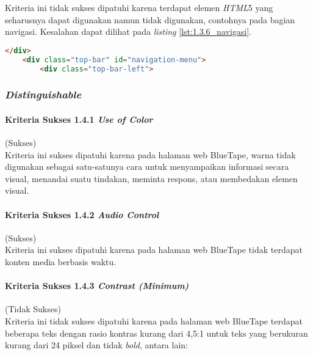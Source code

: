 Kriteria ini tidak sukses dipatuhi karena terdapat elemen \textit{HTML}5 yang seharusnya dapat digunakan namun tidak digunakan, contohnya pada bagian navigasi. Kesalahan dapat dilihat pada \textit{listing} \ref{lst:1.3.6_navigasi}.

\begin{lstlisting}[frame=single, label={lst:1.3.6_navigasi}, language=HTML, caption=Kriteria Sukses 1.3.6 - Navigasi]
    </div>
    <div class="top-bar" id="navigation-menu">
        <div class="top-bar-left">
\end{lstlisting}

\subsubsection{\textit{Distinguishable}}
\label{subsubsec:kepatuhan_bluetape_distinguishable}

\paragraph{Kriteria Sukses 1.4.1 \textit{Use of Color}}
\label{par:kepatuhan_bluetape_kriteria_sukses_1.4.1}
(Sukses)\\

Kriteria ini sukses dipatuhi karena pada halaman web BlueTape, warna tidak digunakan sebagai satu-satunya cara untuk menyampaikan informasi secara visual, menandai suatu tindakan, meminta respons, atau membedakan elemen visual.

\paragraph{Kriteria Sukses 1.4.2 \textit{Audio Control}}
\label{par:kepatuhan_bluetape_kriteria_sukses_1.4.2}
(Sukses)\\

Kriteria ini sukses dipatuhi karena pada halaman web BlueTape tidak terdapat konten media berbasis waktu.

\paragraph{Kriteria Sukses 1.4.3 \textit{Contrast (Minimum)}}
\label{par:kepatuhan_bluetape_kriteria_sukses_1.4.3}
(Tidak Sukses)\\

Kriteria ini tidak sukses dipatuhi karena pada halaman web BlueTape terdapat beberapa teks dengan rasio kontras kurang dari 4,5:1 untuk teks yang berukuran kurang dari 24 piksel dan tidak \textit{bold}, antara lain:

